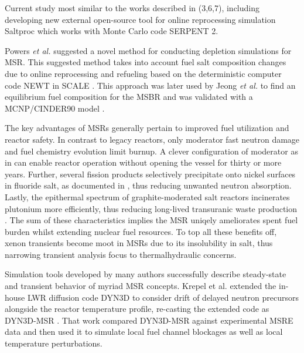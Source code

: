 Current study most similar to the works described in (3,6,7), including developing new external open-source tool for online reprocessing simulation Saltproc which works with Monte Carlo code SERPENT 2. 

Powers \emph{et al.} suggested a novel method for conducting 
depletion simulations for \gls{MSR}. This suggested method takes into account 
fuel salt composition changes due to online reprocessing and refueling based on the deterministic computer code NEWT in SCALE \cite{powers_new_2013}. This approach was later used by Jeong \emph{et al.} to find an equilibrium fuel composition for the \gls{MSBR} and was validated with a \gls{MCNP}/CINDER90 model \cite{jeong_equilibrium_2016}. 

The key advantages of \gls{MSR}s generally pertain to improved fuel utilization
and reactor safety. In contrast to legacy reactors, only moderator fast neutron
damage and fuel chemistry evolution limit burnup. A clever configuration of moderator
as in \cite{engel_conceptual_1980} can enable reactor operation without opening the vessel
for thirty or more years. Further, several fission products selectively precipitate onto
nickel surfaces in fluoride salt, as documented in \cite{engel_conceptual_1980}, thus reducing
unwanted neutron absorption. Lastly, the epithermal spectrum of graphite-moderated salt reactors
incinerates plutonium more efficiently, thus reducing long-lived transuranic waste production \cite{engel_conceptual_1980}.
The sum of these characteristics implies the \gls{MSR} uniqely ameliorates spent fuel burden whilst
extending nuclear fuel resources. To top all these benefits off, xenon transients become moot in
\gls{MSR}s due to its insolubility in salt, thus narrowing transient analysis focus to thermalhydraulic
concerns.

Simulation tools developed by many authors successfully describe steady-state and
transient behavior of myriad \gls{MSR} concepts. Krepel et al. extended the in-house \gls{LWR}
diffusion code DYN3D to consider drift of delayed neutron precursors alongside
the reactor temperature profile, re-casting the extended code as
DYN3D-MSR \cite{krepel_dyn3d-msr_2007}. That work compared DYN3D-MSR against
experimental \gls{MSRE} data and then used it to simulate local fuel channel
blockages as well as local temperature perturbations.